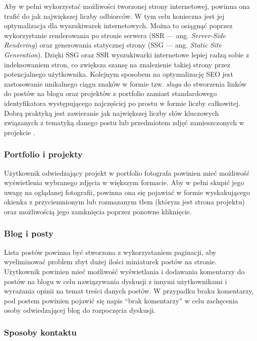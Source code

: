 \documentclass[12pt]{article}
\numberwithin{figure}{section}
\begin{document}
\begin{sloppypar}
Aby w pełni wykorzystać możliwości tworzonej strony internetowej, powinna ona trafić do jak największej liczby odbiorców. W tym celu konieczna jest jej optymalizacja dla wyszukiwarek internetowych. Można to osiągnąć poprzez wykorzystanie renderowania po stronie serwera (SSR --- ang. \textit{Server-Side Rendering}) oraz generowania statycznej strony (SSG --- ang. \textit{Static Site Generation}). Dzięki SSG oraz SSR wyszukiwarki internetowe lepiej radzą sobie z indeksowaniem stron, co zwiększa szansę na znalezienie takiej strony przez potencjalnego użytkownika. Kolejnym sposobem na optymalizację SEO jest zastosowanie unikalnego ciągu znaków w formie tzw. \textit{sluga} do stworzenia linków do postów na blogu oraz projektów z portfolio zamiast standardowego identyfikatora występującego najczęściej po prostu w formie liczby całkowitej. Dobrą praktyką jest zawieranie jak największej liczby słów kluczowych związanych z tematyką danego postu lub przedmiotem zdjęć zamieszczonych w projekcie \cite{seo}.

\subsubsection*{Portfolio i projekty}

Użytkownik odwiedzający projekt w portfolio fotografa powinien mieć możliwość wyświetlenia wybranego zdjęcia w większym formacie. Aby w pełni skupić jego uwagę na oglądanej fotografii, powinna ona się pojawiać w formie wyskakującego okienka z przyciemnionym lub rozmazanym tłem (którym jest strona projektu) oraz możliwością jego zamknięcia poprzez ponowne kliknięcie. 

\subsubsection*{Blog i posty}

Lista postów powinna być stworzona z wykorzystaniem paginacji, aby wyeliminować problem zbyt dużej ilości miniaturek postów na stronie. Użytkownik powinien mieć możliwość wyświetlania i dodawania komentarzy do postów na blogu w celu nawiązywania dyskusji z innymi użytkownikami i wyrażania opinii na temat treści danych postów. W przypadku braku komentarzy, pod postem powinien pojawić się napis ``brak komentarzy'' w celu zachęcenia osoby odwiedzającej blog do rozpoczęcia dyskusji. 


\subsubsection*{Sposoby kontaktu}


\end{sloppypar}
\end{document}
